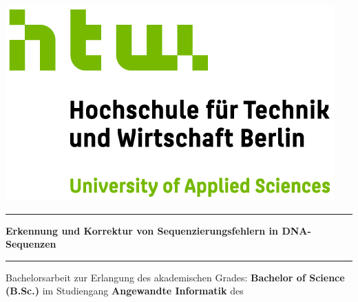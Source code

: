 \documentclass[oneside,bibliography=totocnumbered,BCOR=5mm]{scrbook}%
\theoremstyle{definition}
\theoremstyle{definition}
\theoremstyle{definition}
\theoremstyle{definition}
\theoremstyle{definition}
\theoremstyle{definition}
\begin{document}
\begin{titlepage}
\begin{center}
\includegraphics{images/HTW_Berlin_Logo_farbig.jpg}
\linebreak[4]
\linebreak[4]
\par\noindent\rule{\textwidth}{0.4pt}
\linebreak[4]
\linebreak[4]
\linebreak[4]
\textbf{\LARGE {\color{HTW_green} Erkennung und Korrektur von Sequenzierungsfehlern in DNA-Sequenzen}}
\linebreak[4]
\par\noindent\rule{\textwidth}{0.4pt}
\linebreak[4]
\linebreak[4]
Bachelorsarbeit 
\linebreak[4]
\linebreak[4]
\linebreak[4]
\linebreak[4]
zur Erlangung des akademischen Grades: 
\linebreak[4]
\linebreak[4]
\textbf{Bachelor of Science (B.Sc.)} 
\linebreak[4]
\linebreak[4]
\linebreak[4]
\linebreak[4]
im Studiengang
\linebreak[4]
\linebreak[4]
\textbf{\large{\color{HTW_green} Angewandte Informatik}} 
\linebreak[4]
\linebreak[4]
des
\linebreak[4]

\end{center}
\end{titlepage}
\end{document}
